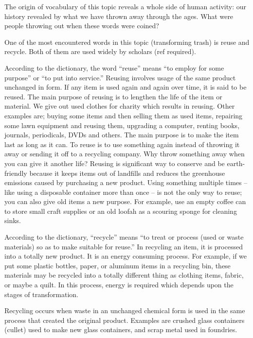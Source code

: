 The origin of vocabulary of this topic reveals a whole side of human activity: our history revealed by what we have thrown away through the ages. What were people throwing out when these words were coined? 

One of the most encountered words in this topic (transforming trash) is reuse and recycle. Both of them are used widely by scholars (ref required).

According to the dictionary, the word “reuse” means “to employ for some purpose” or “to put into service.” Reusing involves usage of the same product unchanged in form. If any item is used again and again over time, it is said to be reused. The main purpose of reusing is to lengthen the life of the item or material. We give out used clothes for charity which results in reusing. Other examples are; buying some items and then selling them as used items, repairing some lawn equipment and reusing them, upgrading a computer, renting books, journals, periodicals, DVDs and others. The main purpose is to make the item last as long as it can. To reuse is to use something again instead of throwing it away or sending it off to a recycling company. Why throw something away when you can give it another life? Reusing is significant way to conserve and be earth-friendly because it keeps items out of landfills and reduces the greenhouse emissions caused by purchasing a new product. Using something multiple times -- like using a disposable container more than once -- is not the only way to reuse; you can also give old items a new purpose. For example, use an empty coffee can to store small craft supplies or an old loofah as a scouring sponge for cleaning sinks.

According to the dictionary, “recycle” means “to treat or process (used or waste materials) so as to make suitable for reuse.” In recycling an item, it is processed into a totally new product. It is an energy consuming process. For example, if we put some plastic bottles, paper, or aluminum items in a recycling bin, these materials may be recycled into a totally different thing as clothing items, fabric, or maybe a quilt. In this process, energy is required which depends upon the stages of transformation.

Recycling occurs when waste in an unchanged chemical form is used in the same process that created the original product. Examples are crushed glass containers (cullet) used to make new glass containers, and scrap metal used in foundries. 

